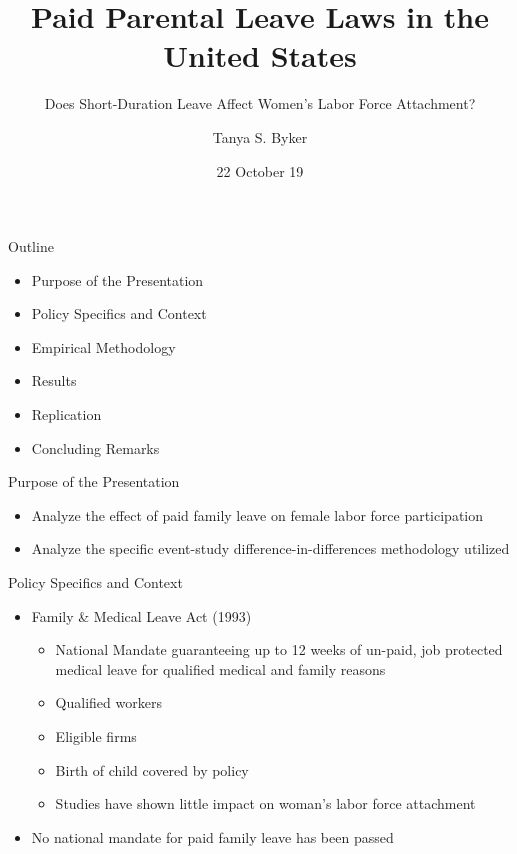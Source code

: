 \documentclass{beamer}
\title[Economics 8160] %
{Paid Parental Leave Laws in the United States}
\subtitle
{Does Short-Duration Leave Affect Women's Labor Force Attachment?} %
\author[Ian Davis] %
{Tanya S. Byker}
\institute[American Economic Review] %
{American Economic Review: Papers \& Proceedings 2016,\\
106(5): 242-246}
\date[Short Occasion] %
{22 October 19}
\begin{document}
\begin{frame}
  \titlepage
\end{frame}

\begin{frame}{Outline}
	\begin{itemize}
	\item
	 Purpose of the Presentation
	\item
	 Policy Specifics and Context
	\item
	 Empirical Methodology
	\item
	 Results
	\item
	 Replication
	\item
	 Concluding Remarks
	\end{itemize}
\end{frame}

\begin{frame}{Purpose of the Presentation}
 
  \begin{itemize}
  \item
    Analyze the effect of paid family leave on female labor force participation
  \item
    Analyze the specific event-study difference-in-differences methodology utilized
  \end{itemize}
\end{frame}

\begin{frame}{Policy Specifics and Context}
	\begin{itemize}		
	\item
	 Family \& Medical Leave Act (1993)
		\begin{itemize}
		\item
		 National Mandate guaranteeing up to 12 weeks of un-paid, job protected medical leave for qualified medical and family reasons
		\item
		 Qualified workers
		\item
		 Eligible firms
		\item
		 Birth of child covered by policy
		\item
		 Studies have shown little impact on woman's labor force attachment
		\end{itemize}
	\item
	 No national mandate for paid family leave has been passed
	\end{itemize}
\end{frame}
	
\end{document}
